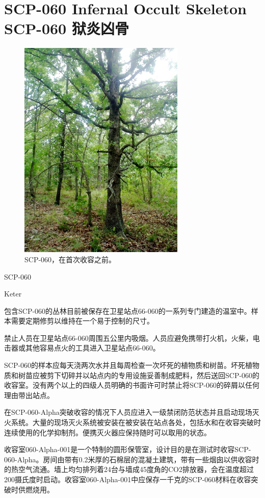 \chapter[SCP-060 狱炎凶骨]{
    SCP-060 Infernal Occult Skeleton\\
    SCP-060 狱炎凶骨
}

\label{chap:SCP-060}

\begin{figure}[H]
    \centering
    \includegraphics[width=0.5\linewidth]{images/SCP.060.jpg}
    \caption*{SCP-060，在首次收容之前。}
\end{figure}

SCP-060

Keter

包含SCP-060的丛林目前被保存在卫星站点66-060的一系列专门建造的温室中。样本需要定期修剪以维持在一个易于控制的尺寸。

禁止人员在卫星站点66-060周围五公里内吸烟。人员应避免携带打火机，火柴，电击器或其他容易点火的工具进入卫星站点66-060。

SCP-060的样本应每天浇两次水并且每周检查一次坏死的植物质和树苗。坏死植物质和树苗应被剪下切碎并以站点内的专用设施妥善制成肥料，然后送回SCP-060的收容室。没有两个以上的四级人员明确的书面许可时禁止将SCP-060的碎屑以任何理由带出站点。

在SCP-060-Alpha突破收容的情况下人员应进入一级禁闭防范状态并且启动现场灭火系统。大量的现场灭火系统被安装在被安装在站点各处，包括水和在收容突破时连续使用的化学抑制剂。便携灭火器应保持随时可以取用的状态。

收容室060-Alpha-001是一个特制的圆形保管室，设计目的是在测试时收容SCP-060-Alpha。房间由带有0.2米厚的石棉层的混凝土建筑，带有一些烟囱以供收容时的热空气流通。墙上均匀排列着24台与墙成45度角的CO2排放器，会在温度超过200摄氏度时启动。收容室060-Alpha-001中应保存一千克的SCP-060材料在收容突破时供燃烧用。

